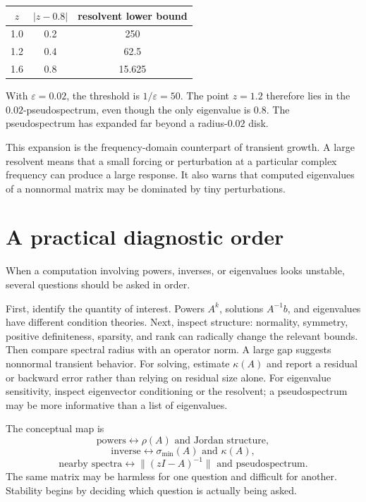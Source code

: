 \begin{center}
\small
\begin{tabular}{@{}c|c|c@{}}
\toprule
\(z\) & \(|z-0.8|\) & resolvent lower bound\\
\midrule
1.0 & 0.2 & 250\\
1.2 & 0.4 & 62.5\\
1.6 & 0.8 & 15.625\\
\bottomrule
\end{tabular}
\end{center}

With \(\varepsilon=0.02\), the threshold is \(1/\varepsilon=50\).  The point \(z=1.2\) therefore lies in the \(0.02\)-pseudospectrum, even though the only eigenvalue is \(0.8\).  The pseudospectrum has expanded far beyond a radius-\(0.02\) disk.

This expansion is the frequency-domain counterpart of transient growth.  A large resolvent means that a small forcing or perturbation at a particular complex frequency can produce a large response.  It also warns that computed eigenvalues of a nonnormal matrix may be dominated by tiny perturbations.

\section{A practical diagnostic order}

When a computation involving powers, inverses, or eigenvalues looks unstable, several questions should be asked in order.

First, identify the quantity of interest.  Powers \(A^k\), solutions \(A^{-1}b\), and eigenvalues have different condition theories.  Next, inspect structure: normality, symmetry, positive definiteness, sparsity, and rank can radically change the relevant bounds.  Then compare spectral radius with an operator norm.  A large gap suggests nonnormal transient behavior.  For solving, estimate \(\kappa(A)\) and report a residual or backward error rather than relying on residual size alone.  For eigenvalue sensitivity, inspect eigenvector conditioning or the resolvent; a pseudospectrum may be more informative than a list of eigenvalues.

The conceptual map is
\[
  \text{powers}
  \longleftrightarrow
  \rho(A)\text{ and Jordan structure},
\]
\[
  \text{inverse}
  \longleftrightarrow
  \sigma_{\min}(A)\text{ and }\kappa(A),
\]
\[
  \text{nearby spectra}
  \longleftrightarrow
  \|(zI-A)^{-1}\|\text{ and pseudospectrum}.
\]
The same matrix may be harmless for one question and difficult for another.  Stability begins by deciding which question is actually being asked.
